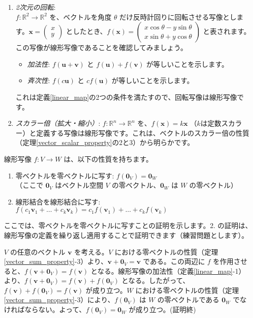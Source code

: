 \begin{ex}
\begin{enumerate}
\item \emph{2次元の回転}:\\
    $f: \mathbb{R}^2 \to \mathbb{R}^2$ を、ベクトルを角度 $\theta$ だけ反時計回りに回転させる写像とします。$\bm{x} = \begin{pmatrix} x \\ y \end{pmatrix}$ としたとき、$f(\bm{x}) = \begin{pmatrix} x\cos\theta - y\sin\theta \\ x\sin\theta + y\cos\theta \end{pmatrix}$ と表されます。この写像が線形写像であることを確認してみましょう。
	\begin{itemize}
	\item \emph{加法性}: $f(\bm{u} + \bm{v})$ と $f(\bm{u}) + f(\bm{v})$ が等しいことを示します。
    \item \emph{斉次性}: $f(c\bm{u})$ と $c f(\bm{u})$ が等しいことを示します。
    \end{itemize}
    これは定義\ref{linear_map}の2つの条件を満たすので、回転写像は線形写像です。
\item \emph{スカラー倍（拡大・縮小）}:
    $f: \mathbb{R}^n \to \mathbb{R}^n$ を、$f(\bm{x}) = k\bm{x}$ （$k$は定数スカラー）と定義する写像は線形写像です。これは、ベクトルのスカラー倍の性質（定理\ref{vector_scalar_property}の2と3）から明らかです。
\end{enumerate}
\end{ex}

\begin{thm}[線形写像の性質] \label{linear_map_property}
線形写像 $f: V \to W$ は、以下の性質を持ちます。
\begin{enumerate}
\item 零ベクトルを零ベクトルに写す: $f(\bm{0}_V) = \bm{0}_W$\\
    （ここで $\bm{0}_V$ はベクトル空間 $V$ の零ベクトル、$\bm{0}_W$ は $W$ の零ベクトル）
\item 線形結合を線形結合に写す: $f(c_1\bm{v}_1 + \dots + c_k\bm{v}_k) = c_1 f(\bm{v}_1) + \dots + c_k f(\bm{v}_k)$
\end{enumerate}
\begin{proof*}
ここでは、零ベクトルを零ベクトルに写すことの証明を示します。2. の証明は、線形写像の定義を繰り返し適用することで証明できます（練習問題とします）。\par
$V$ の任意のベクトル $\bm{v}$ を考える。$V$ における零ベクトルの性質（定理\ref{vector_sum_property}-3）より、$\bm{v} + \bm{0}_V = \bm{v}$ である。この両辺に $f$ を作用させると、$f(\bm{v} + \bm{0}_V) = f(\bm{v})$ となる。線形写像の加法性（定義\ref{linear_map}-1）より、$f(\bm{v} + \bm{0}_V) = f(\bm{v}) + f(\bm{0}_V)$ となる。したがって、$f(\bm{v}) + f(\bm{0}_V) = f(\bm{v})$ が成り立つ。$W$ における零ベクトルの性質（定理\ref{vector_sum_property}-3）により、$f(\bm{0}_V)$ は $W$ の零ベクトルである $\bm{0}_W$ でなければならない。よって、$f(\bm{0}_V) = \bm{0}_W$ が成り立つ。(証明終)
\end{proof*}
\end{thm}

